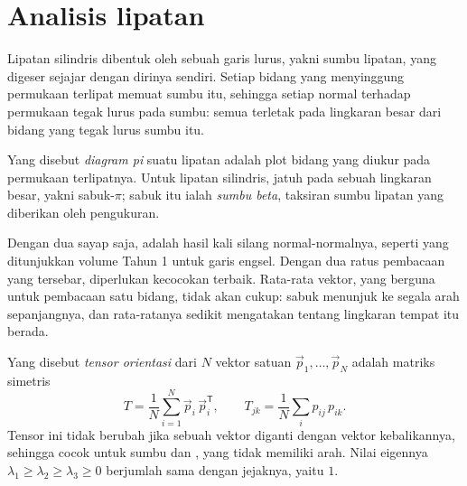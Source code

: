 \section{Analisis lipatan}\label{sec:b3:structural-analysis:folds}

Lipatan silindris dibentuk oleh sebuah garis lurus, yakni sumbu lipatan, yang digeser
sejajar dengan dirinya sendiri. Setiap bidang yang menyinggung permukaan terlipat memuat
sumbu itu, sehingga setiap normal terhadap permukaan tegak lurus pada sumbu: semua
 terletak pada lingkaran besar dari bidang yang tegak lurus sumbu itu.

\begin{definition}\label{def:b3:structural-analysis:pi}
Yang disebut \emph{diagram pi} suatu lipatan adalah plot 
bidang yang diukur pada permukaan terlipatnya. Untuk lipatan silindris,  jatuh pada
sebuah lingkaran besar, yakni sabuk-$\pi$;  sabuk itu ialah
\emph{sumbu beta}, taksiran sumbu lipatan yang diberikan oleh
pengukuran.
\end{definition}

Dengan dua sayap saja,  adalah hasil kali silang normal-normalnya, seperti
yang ditunjukkan volume Tahun 1 untuk garis engsel. Dengan dua ratus pembacaan yang tersebar,
diperlukan kecocokan terbaik. Rata-rata vektor, yang berguna untuk pembacaan
satu bidang, tidak akan cukup:  sabuk menunjuk ke segala arah sepanjangnya, dan
rata-ratanya sedikit mengatakan tentang lingkaran tempat  itu berada.

\begin{definition}\label{def:b3:structural-analysis:orientation-tensor}
Yang disebut \emph{tensor orientasi} dari $N$ vektor satuan
$\vec p_1, \dots, \vec p_N$ adalah matriks simetris
\[
  T = \frac1N\sum_{i=1}^N \vec p_i\,\vec p_i^{\mathsf T},
  \qquad T_{jk} = \frac1N\sum_i p_{ij}\,p_{ik} .
\]
Tensor ini tidak berubah jika sebuah vektor diganti dengan vektor kebalikannya, sehingga cocok untuk
sumbu dan , yang tidak memiliki arah. Nilai eigennya $\lambda_1 \ge \lambda_2
\ge \lambda_3 \ge 0$ berjumlah sama dengan jejaknya, yaitu $1$.
\end{definition}


